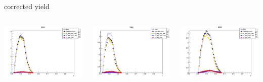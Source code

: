 \begin{frame}{corrected yield}
\begin{columns}
\begin{column}[T]{0.25\textwidth}
\includegraphics[width = \textwidth]{results/yield/statistics_corr/yield_x_Q2_z_0.65_5.500_0.40_pos.png}
\end{column}
\begin{column}[T]{0.25\textwidth}
\includegraphics[width = \textwidth]{results/yield/statistics_corr/yield_x_Q2_z_0.65_5.500_0.40_neg.png}
\end{column}
\begin{column}[T]{0.25\textwidth}
\includegraphics[width = \textwidth]{results/yield/statistics_corr/yield_x_Q2_z_0.65_5.500_0.50_pos.png}

\end{column}
\end{columns}
\end{frame}
